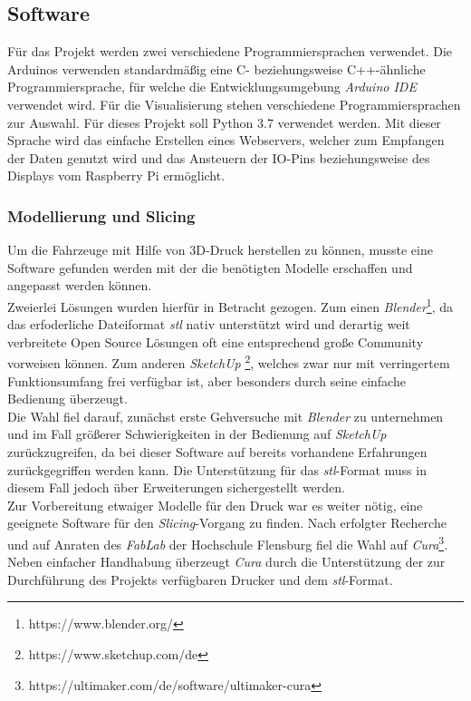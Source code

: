 \documentclass[.../Dokumentation.tex]{subfiles}
\begin{document}
\subsection{Software}\label{sec-components-software}
Für das Projekt werden zwei verschiedene Programmiersprachen verwendet. 
Die Arduinos verwenden standardmäßig eine C- beziehungsweise C++-ähnliche 
Programmiersprache, für welche die Entwicklungsumgebung 
\textit{Arduino IDE} verwendet wird. 
Für die Visualisierung stehen verschiedene Programmiersprachen zur Auswahl. 
Für dieses Projekt soll Python 3.7 verwendet werden. Mit dieser Sprache wird das einfache Erstellen eines Webservers, welcher zum Empfangen 
der Daten genutzt wird und das Ansteuern der IO-Pins beziehungsweise des 
Displays vom Raspberry Pi ermöglicht.

\subsubsection{Modellierung und Slicing}\label{sec-components-software-model}
Um die Fahrzeuge mit Hilfe von 3D-Druck herstellen zu können, musste eine 
Software gefunden werden mit der die benötigten Modelle erschaffen und angepasst 
werden können.\\
Zweierlei Lösungen wurden hierfür in Betracht gezogen.
Zum einen \textit{Blender}\footnote{https://www.blender.org/},
da das erfoderliche Dateiformat 
\textit{stl} nativ unterstützt wird und derartig weit verbreitete Open 
Source Lösungen oft eine entsprechend große Community vorweisen können.
Zum anderen \textit{SketchUp} \footnote{https://www.sketchup.com/de},
welches zwar nur mit verringertem 
Funktionsumfang frei verfügbar ist, aber besonders durch seine einfache 
Bedienung überzeugt.\\
Die Wahl fiel darauf, zunächst erste Gehversuche mit \textit{Blender} 
zu unternehmen und im Fall größerer Schwierigkeiten in der Bedienung auf 
\textit{SketchUp} zurückzugreifen, da bei dieser Software auf bereits 
vorhandene Erfahrungen zurückgegriffen werden kann. 
Die Unterstützung für das \textit{stl}-Format 
muss in diesem Fall jedoch über Erweiterungen sichergestellt werden.\\
Zur Vorbereitung etwaiger Modelle für den Druck war es weiter nötig, 
eine geeignete Software für den \textit{Slicing}-Vorgang zu finden.
Nach erfolgter Recherche und auf Anraten des \textit{FabLab} der Hochschule 
Flensburg fiel die Wahl auf 
\textit{Cura}\footnote{https://ultimaker.com/de/software/ultimaker-cura}.
Neben einfacher Handhabung überzeugt \textit{Cura} durch die Unterstützung 
der zur Durchführung des Projekts verfügbaren Drucker und dem 
\textit{stl}-Format.
\end{document}
